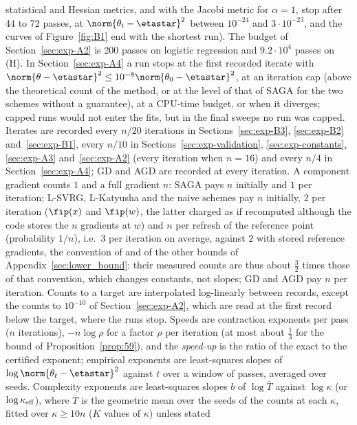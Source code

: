 statistical and Hessian metrics, and with the Jacobi metric for $\alpha=1$, stop after 44 to 72 passes, at
$\norm{\theta_t-\etastar}^2$ between $10^{-24}$ and $3\cdot10^{-23}$, and the curves of Figure~\ref{fig:B1} end with the
shortest run). The budget of Section~\ref{sec:exp-A2} is 200 passes on logistic regression and $9.2\cdot10^4$ passes on
(H). In Section~\ref{sec:exp-A4} a run stops at the first recorded iterate with
$\norm{\theta-\etastar}^2\le10^{-8}\norm{\theta_0-\etastar}^2$, at an iteration cap (above the theoretical count of the
method, or at the level of that of SAGA for the two schemes without a guarantee), at a CPU-time budget, or when it
diverges; capped runs would not enter the fits, but in the final sweeps no run was capped. Iterates are recorded every
$n/20$ iterations in Sections~\ref{sec:exp-B3}, \ref{sec:exp-B2} and~\ref{sec:exp-B1}, every $n/10$ in
Sections~\ref{sec:exp-validation}, \ref{sec:exp-constants}, \ref{sec:exp-A3} and~\ref{sec:exp-A2} (every iteration when
$n=16$) and every $n/4$ in Section~\ref{sec:exp-A4}; GD and AGD are recorded at every iteration. A component gradient
counts $1$ and a full gradient $n$: SAGA pays $n$ initially and $1$ per iteration; L-SVRG, L-Katyusha and the naive
schemes pay $n$ initially, $2$ per iteration ($\fip(x)$ and $\fip(w)$, the latter charged as if recomputed although the
code stores the $n$ gradients at $w$) and $n$ per refresh of the reference point (probability $1/n$), i.e.\ $3$ per
iteration on average, against $2$ with stored reference gradients, the convention of  and of the
other bounds of Appendix~\ref{sec:lower_bound}: their measured counts are thus about $\frac32$ times those of that
convention, which changes constants, not slopes; GD and AGD pay $n$ per iteration. Counts to a target are interpolated
log-linearly between records, except the counts to $10^{-10}$ of Section~\ref{sec:exp-A2}, which are read at the first record below the
target, where the runs stop. Speeds are contraction exponents per pass ($n$ iterations), $-n\log\rho$ for
a factor $\rho$ per iteration (at most about $\frac13$ for the bound of Proposition~\ref{prop:59}), and the
\emph{speed-up} is the ratio of the exact to the certified exponent; empirical exponents are least-squares slopes of
$\log\norm{\theta_t-\etastar}^2$ against $t$ over a window of passes, averaged over seeds. Complexity exponents are
least-squares slopes $b$ of $\log\bar T$ against $\log\kappa$ (or $\log\kappa_{\rm eff}$), where $\bar T$ is the geometric
mean over the seeds of the counts at each $\kappa$, fitted over $\kappa\ge10n$ ($K$ values of $\kappa$) unless stated
